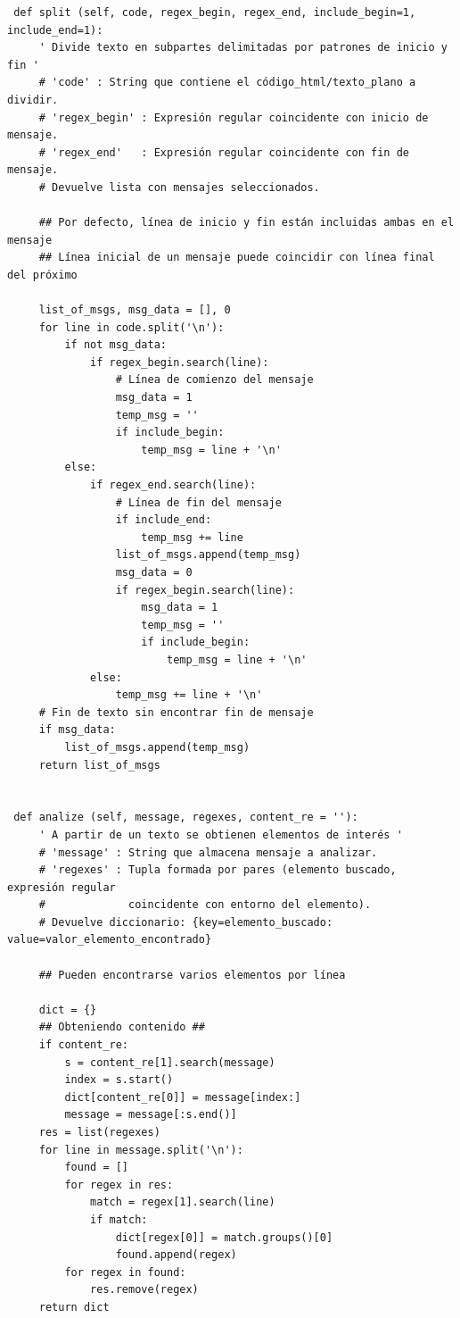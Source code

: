 {\scriptsize
\begin{verbatim}
 def split (self, code, regex_begin, regex_end, include_begin=1, include_end=1):
     ' Divide texto en subpartes delimitadas por patrones de inicio y fin '
     # 'code' : String que contiene el código_html/texto_plano a dividir.
     # 'regex_begin' : Expresión regular coincidente con inicio de mensaje.
     # 'regex_end'   : Expresión regular coincidente con fin de mensaje.
     # Devuelve lista con mensajes seleccionados.

     ## Por defecto, línea de inicio y fin están incluidas ambas en el mensaje
     ## Línea inicial de un mensaje puede coincidir con línea final del próximo

     list_of_msgs, msg_data = [], 0
     for line in code.split('\n'):
         if not msg_data:
             if regex_begin.search(line):
                 # Línea de comienzo del mensaje
                 msg_data = 1
                 temp_msg = ''
                 if include_begin:
                     temp_msg = line + '\n'
         else:
             if regex_end.search(line):
                 # Línea de fin del mensaje
                 if include_end:
                     temp_msg += line
                 list_of_msgs.append(temp_msg)
                 msg_data = 0
                 if regex_begin.search(line):
                     msg_data = 1
                     temp_msg = ''
                     if include_begin:
                         temp_msg = line + '\n'
             else:
                 temp_msg += line + '\n'
     # Fin de texto sin encontrar fin de mensaje
     if msg_data:
         list_of_msgs.append(temp_msg)
     return list_of_msgs


 def analize (self, message, regexes, content_re = ''):
     ' A partir de un texto se obtienen elementos de interés '
     # 'message' : String que almacena mensaje a analizar.
     # 'regexes' : Tupla formada por pares (elemento buscado, expresión regular
     #             coincidente con entorno del elemento).
     # Devuelve diccionario: {key=elemento_buscado: value=valor_elemento_encontrado}

     ## Pueden encontrarse varios elementos por línea

     dict = {}
     ## Obteniendo contenido ##
     if content_re:
         s = content_re[1].search(message)
         index = s.start()
         dict[content_re[0]] = message[index:]
         message = message[:s.end()]
     res = list(regexes)
     for line in message.split('\n'):
         found = []
         for regex in res:
             match = regex[1].search(line)
             if match:
                 dict[regex[0]] = match.groups()[0]
                 found.append(regex)
         for regex in found:
             res.remove(regex)
     return dict



\end{verbatim}}
